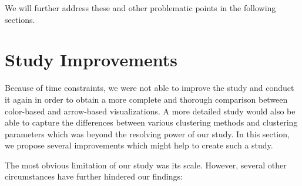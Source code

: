 We will further address these and other problematic points in the following sections.

\section{Study Improvements}

Because of time constraints, we were not able to improve the study and conduct it again in order to obtain a more complete and thorough comparison between color-based and arrow-based visualizations. A more detailed study would also be able to capture the differences between various clustering methods and clustering parameters which was beyond the resolving power of our study. In this section, we propose several improvements which might help to create such a study.

The most obvious limitation of our study was its scale. However, several other circumstances have further hindered our findings:

